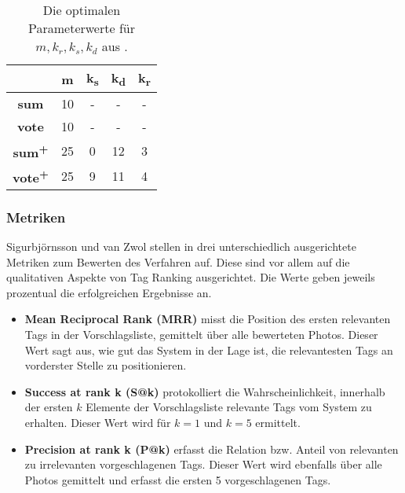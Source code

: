 \begin{table}[htbp]
  \centering
  \begin{tabular}{ccccc}
    \hline
     & \textbf{m} & \textbf{k\textsubscript{s}} & \textbf{k\textsubscript{d}} & \textbf{k\textsubscript{r}}\\
    \hline                          
    \textbf{sum} & 10 & - & - & -\\
    \hline                          
    \textbf{vote} & 10 & - & - & -\\
    \hline                          
    \textbf{sum\textsuperscript{+}} & 25 & 0 & 12 & 3\\
    \hline                          
    \textbf{vote\textsuperscript{+}} & 25 & 9 & 11 & 4\\
    \hline
  \end{tabular}
  \caption{Die optimalen Parameterwerte für $m,	k_r,	k_s, k_d$ aus \cite{collectiveKnowledge}.}
  \label{tab:optimalParameterBjoern}
\end{table}



\subsubsection{Metriken} %
\label{ssub:metriken}
Sigurbjörnsson und van Zwol stellen in \cite{collectiveKnowledge} drei unterschiedlich ausgerichtete Metriken zum Bewerten des Verfahren auf. Diese sind vor allem auf die qualitativen Aspekte von Tag Ranking ausgerichtet. Die Werte geben jeweils prozentual die erfolgreichen Ergebnisse an.
\begin{itemize}
  \item \textbf{Mean Reciprocal Rank (MRR)} misst die Position des ersten relevanten Tags in der Vorschlagsliste, gemittelt über alle bewerteten Photos. Dieser Wert sagt aus, wie gut das System in der Lage ist, die relevantesten Tags an vorderster Stelle zu positionieren.
  \item \textbf{Success at rank k (S@k)} protokolliert die Wahrscheinlichkeit, innerhalb der ersten $k$ Elemente der Vorschlagsliste relevante Tags vom System zu erhalten. Dieser Wert wird für $k = 1$ und $k = 5$ ermittelt.
  \item \textbf{Precision at rank k (P@k)} erfasst die Relation bzw. Anteil von relevanten zu irrelevanten vorgeschlagenen Tags. Dieser Wert wird ebenfalls über alle Photos gemittelt und erfasst die ersten 5 vorgeschlagenen Tags.
\end{itemize}


